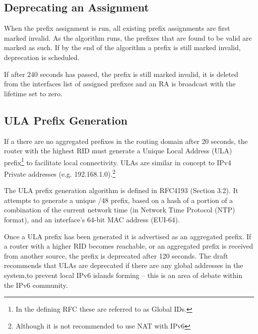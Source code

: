 \documentclass[12pt,a4paper,twoside]{report}
\begin{document}
\subsection{Deprecating an Assignment}
When the prefix assignment is run, all existing prefix assignments are first
marked invalid. As the algorithm runs, the prefixes that are found to be valid
are marked as such. If by the end of the algorithm a prefix is still marked
invalid, deprecation is scheduled. 

If after 240 seconds has passed, the prefix is still marked invalid, it is
deleted from the interfaces list of assigned prefixes and an RA is broadcast
with the lifetime set to zero. 

\subsection{ULA Prefix Generation}
If a there are no aggregated prefixes in the routing domain after 20 seconds,
the router with the highest RID must generate a Unique Local Address
(ULA) prefix\footnote{In the defining
RFC these are referred to as Global IDs.} to facilitate local connectivity.
ULAs are similar in concept to IPv4 Private addresses (e.g.
192.168.1.0).\footnote{Although it is not recommended to use NAT with IPv6}

The ULA prefix generation algorithm is defined in RFC4193 (Section
3.2)\cite{rfc4193}. It attempts to generate a unique /48 prefix, based on a
hash of a portion of a combination of the current network time (in Network Time
Protocol (NTP)  format), and an
interface's 64-bit MAC address (EUI-64).

Once a ULA prefix has been generated it is advertised as an aggregated prefix.
If a router with a higher RID becomes reachable, or an aggregated prefix is
received from another source, the prefix is deprecated after 120 seconds. The
draft recommends that ULAs are deprecated if there are any global addresses in
the system,to prevent local IPv6 islands forming -- this is an area of debate
within the IPv6 community. 
\end{document}
